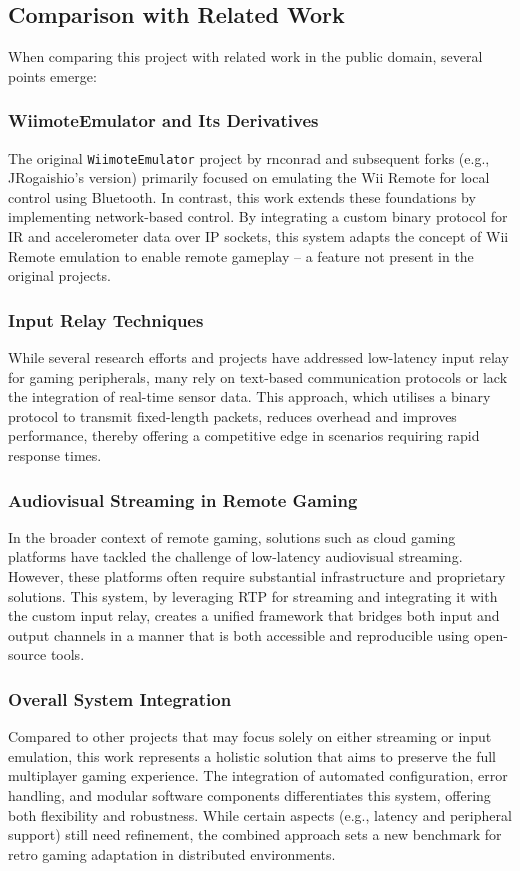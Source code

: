 \subsection*{Comparison with Related Work}
When comparing this project with related work in the public domain, several points emerge:

\subsubsection{WiimoteEmulator and Its Derivatives}
The original \texttt{WiimoteEmulator} project by rnconrad and subsequent forks (e.g., JRogaishio's version) primarily focused on emulating the Wii Remote for local control using Bluetooth. In contrast, this work extends these foundations by implementing network-based control. By integrating a custom binary protocol for IR and accelerometer data over IP sockets, this system adapts the concept of Wii Remote emulation to enable remote gameplay -- a feature not present in the original projects.

\subsubsection{Input Relay Techniques}
While several research efforts and projects have addressed low-latency input relay for gaming peripherals, many rely on text-based communication protocols or lack the integration of real-time sensor data. This approach, which utilises a binary protocol to transmit fixed-length packets, reduces overhead and improves performance, thereby offering a competitive edge in scenarios requiring rapid response times.

\subsubsection{Audiovisual Streaming in Remote Gaming}
In the broader context of remote gaming, solutions such as cloud gaming platforms have tackled the challenge of low-latency audiovisual streaming. However, these platforms often require substantial infrastructure and proprietary solutions. This system, by leveraging RTP for streaming and integrating it with the custom input relay, creates a unified framework that bridges both input and output channels in a manner that is both accessible and reproducible using open-source tools.

\subsubsection{Overall System Integration}
Compared to other projects that may focus solely on either streaming or input emulation, this work represents a holistic solution that aims to preserve the full multiplayer gaming experience. The integration of automated configuration, error handling, and modular software components differentiates this system, offering both flexibility and robustness. While certain aspects (e.g., latency and peripheral support) still need refinement, the combined approach sets a new benchmark for retro gaming adaptation in distributed environments.


